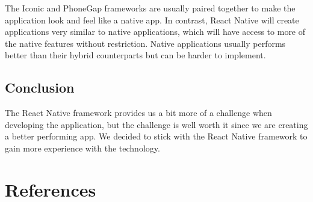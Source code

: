 \documentclass[onecolumn, draftclsnofoot,10pt, compsoc]{IEEEtran}
\begin{document}
The Iconic and PhoneGap frameworks are usually paired together to make the application look and feel like a native app. In contrast, React Native will create applications very similar to native applications, which will have access to more of the native features without restriction. Native applications usually performs better than their hybrid counterparts but can be harder to implement.
\subsection{Conclusion}

The React Native framework provides us a bit more of a challenge when developing the application, but the challenge is well worth it since we are creating a better performing app. We decided to stick with the React Native framework to gain more experience with the technology.

\clearpage
\section{References}
\end{document}
